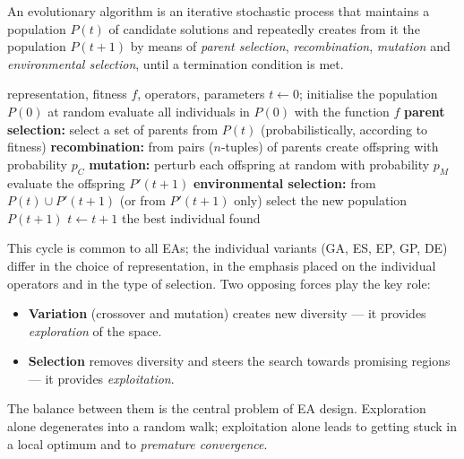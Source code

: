 \documentclass[11pt,a4paper]{article}
\theoremstyle{definition}
\begin{document}
\begin{defbox}
An evolutionary algorithm is an iterative stochastic process that maintains a
population $P(t)$ of candidate solutions and repeatedly creates from it the
population $P(t+1)$ by means of \emph{parent selection}, \emph{recombination},
\emph{mutation} and \emph{environmental selection}, until a termination
condition is met.
\end{defbox}

\begin{algorithm}[!ht]
\caption{General scheme of an evolutionary algorithm}
\begin{algorithmic}[1]
\Require representation, fitness $f$, operators, parameters
\State $t \gets 0$; initialise the population $P(0)$ at random
\State evaluate all individuals in $P(0)$ with the function $f$
  \State \textbf{parent selection:} select a set of parents from $P(t)$ (probabilistically, according to fitness)
  \State \textbf{recombination:} from pairs ($n$-tuples) of parents create offspring with probability $p_C$
  \State \textbf{mutation:} perturb each offspring at random with probability $p_M$
  \State evaluate the offspring $P'(t+1)$
  \State \textbf{environmental selection:} from $P(t) \cup P'(t+1)$ (or from $P'(t+1)$ only) select the new population $P(t+1)$
  \State $t \gets t+1$
\EndWhile
\Ensure the best individual found
\end{algorithmic}
\end{algorithm}

This cycle is common to all EAs; the individual variants (GA, ES, EP, GP, DE)
differ in the choice of representation, in the emphasis placed on the individual
operators and in the type of selection. Two opposing forces play the key role:

\begin{itemize}
\item \textbf{Variation} (crossover and mutation) creates new diversity --- it
  provides \emph{exploration} of the space.
\item \textbf{Selection} removes diversity and steers the search towards
  promising regions --- it provides \emph{exploitation}.
\end{itemize}

The balance between them is the central problem of EA design. Exploration alone
degenerates into a random walk; exploitation alone leads to getting stuck in a
local optimum and to \emph{premature convergence}.
\end{document}
